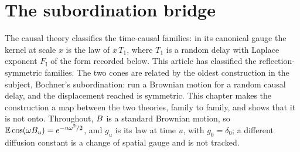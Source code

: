 %
%
%
%
%

\chapter{The subordination bridge}
\label{ch:bridge}

The causal theory classifies the time-causal families: in its canonical gauge the kernel at
scale $x$ is the law of $x\,T_1$, where $T_1$ is a random delay with Laplace exponent
$F_{\mathrm I}$ of the form recorded below. This article has classified the
reflection-symmetric families. The two cones are related by the oldest construction in the
subject, Bochner's subordination: run a Brownian motion for a random causal delay, and the
displacement reached is symmetric. This chapter makes the construction a map between the two
theories, family to family, and shows that it is not onto. Throughout, $B$ is a standard
Brownian motion, so $\mathbb{E}\cos(\omega B_u) = e^{-u\omega^2/2}$, and $g_u$ is its law at
time $u$, with $g_0 = \delta_0$; a different diffusion constant is a change of spatial gauge
and is not tracked.

